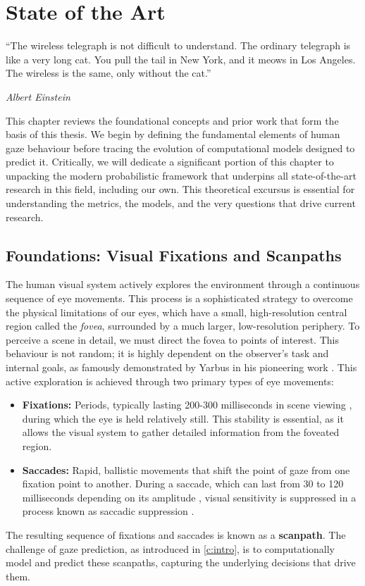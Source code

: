 \chapter{State of the Art}
\label{c:sota}

\epigraph{\enquote{The wireless telegraph is not difficult to understand. The ordinary telegraph is like a very long cat. You pull the tail in New York, and it meows in Los Angeles. The wireless is the same, only without the cat.}}{\emph{Albert Einstein}}

This chapter reviews the foundational concepts and prior work that form the basis of this thesis. We begin by defining the fundamental elements of human gaze behaviour before tracing the evolution of computational models designed to predict it. Critically, we will dedicate a significant portion of this chapter to unpacking the modern probabilistic framework that underpins all state-of-the-art research in this field, including our own. This theoretical excursus is essential for understanding the metrics, the models, and the very questions that drive current research.
\section{Foundations: Visual Fixations and Scanpaths}
\label{sec:sota_fixations}
The human visual system actively explores the environment through a continuous sequence of eye movements. This process is a sophisticated strategy to overcome the physical limitations of our eyes, which have a small, high-resolution central region called the \emph{fovea}, surrounded by a much larger, low-resolution periphery. To perceive a scene in detail, we must direct the fovea to points of interest. This behaviour is not random; it is highly dependent on the observer's task and internal goals, as famously demonstrated by Yarbus in his pioneering work \cite{yarbus1967}.
This active exploration is achieved through two primary types of eye movements:
\begin{itemize}
\item \textbf{Fixations:} Periods, typically lasting 200-300 milliseconds in scene viewing \cite{henderson2003}, during which the eye is held relatively still. This stability is essential, as it allows the visual system to gather detailed information from the foveated region.
\item \textbf{Saccades:} Rapid, ballistic movements that shift the point of gaze from one fixation point to another. During a saccade, which can last from 30 to 120 milliseconds depending on its amplitude \cite{rayner1998}, visual sensitivity is suppressed in a process known as saccadic suppression \cite{ibbotson2011}.
\end{itemize}
The resulting sequence of fixations and saccades is known as a \textbf{scanpath}. The challenge of gaze prediction, as introduced in \cref{c:intro}, is to computationally model and predict these scanpaths, capturing the underlying decisions that drive them.

